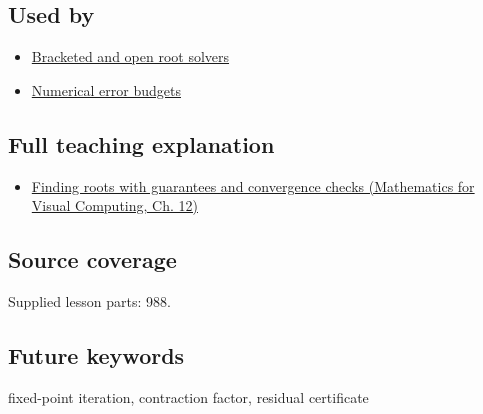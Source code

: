 \subsection{Used by}\label{appendix-d83b0ad1be7f-used-by}

\hypertarget{appendix-d83b0ad1be7f-used-by}{}

\begin{itemize}
\tightlist
\item
  \hyperref[appendix-f63eb850796d]{Bracketed and open root solvers}
\item
  \hyperref[appendix-31b8c295e05f]{Numerical error budgets}
\end{itemize}

\subsection{Full teaching explanation}\label{appendix-d83b0ad1be7f-full-teaching-explanation}

\hypertarget{appendix-d83b0ad1be7f-full-teaching-explanation}{}

\begin{itemize}
\tightlist
\item
  \href{../02-Mathematics-for-Visual-Computing/main.pdf\#nameddest=02-foundations-ii-ch028-finding-roots-with-guarantees-and-convergence-checks}{Finding roots with guarantees and convergence checks (Mathematics for Visual Computing, Ch. 12)}
\end{itemize}

\subsection{Source coverage}\label{appendix-d83b0ad1be7f-source-coverage}

\hypertarget{appendix-d83b0ad1be7f-source-coverage}{}

Supplied lesson parts: 988.

\subsection{Future keywords}\label{appendix-d83b0ad1be7f-future-keywords}

\hypertarget{appendix-d83b0ad1be7f-future-keywords}{}

fixed-point iteration, contraction factor, residual certificate

